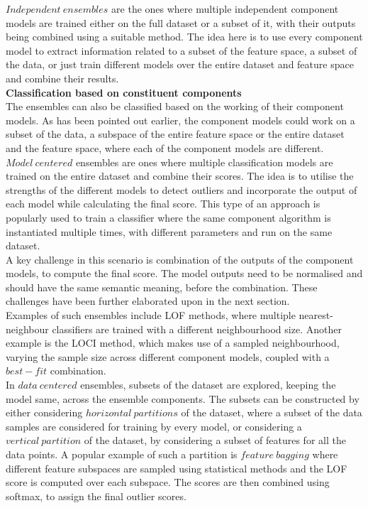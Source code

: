 $Independent\ ensembles$ are the ones where multiple independent component models are trained either on the full dataset or a subset of it, with their outputs being combined using a suitable method. The idea here is to use every component model to extract information related to a subset of the feature space, a subset of the data, or just train different models over the entire dataset and feature space and combine their results. \\

\noindent \textbf{Classification based on constituent components} \\

The ensembles can also be classified based on the working of their component models. As has been pointed out earlier, the component models could work on a subset of the data, a subspace of the entire feature space or the entire dataset and the feature space, where each of the component models are different. \\

$Model\ centered$ ensembles are ones where multiple classification models are trained on the entire dataset and combine their scores. The idea is to utilise the strengths of the different models to detect outliers and incorporate the output of each model while calculating the final score. This type of an approach is popularly used to train a classifier where the same component algorithm is instantiated multiple times, with different parameters and run on the same dataset. \\

A key challenge in this scenario is combination of the outputs of the component models, to compute the final score. The model outputs need to be normalised and should have the same semantic meaning, before the combination. These challenges have been further elaborated upon in the next section. \\

Examples of such ensembles include LOF methods, where multiple nearest-neighbour classifiers are trained with a different neighbourhood size. Another example is the LOCI method, which makes use of a sampled neighbourhood, varying the sample size across different component models, coupled with a $best-fit$ combination. \\

In $data\ centered$ ensembles, subsets of the dataset are explored, keeping the model same, across the ensemble components. The subsets can be constructed by either considering $horizontal\ partitions$ of the dataset, where a subset of the data samples are considered for training by every model, or considering a $vertical\ partition$ of the dataset, by considering a subset of features for all the data points. A popular example of such a partition is $feature\ bagging$ where different feature subspaces are sampled using statistical methods and the LOF score is computed over each subspace. The scores are then combined using softmax, to assign the final outlier scores. \\

